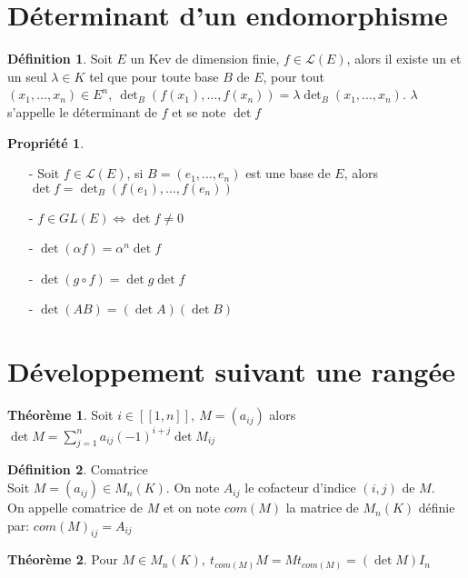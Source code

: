 \documentclass[fleqn]{article}
\theoremstyle{definition} \newtheorem*{defi}{D\'efinition}
\theoremstyle{definition} \newtheorem*{theo}{Th\'eor\`eme}
\theoremstyle{definition} \newtheorem*{coro}{Corollaire}
\theoremstyle{definition} \newtheorem*{nota}{Notation}
\theoremstyle{definition} \newtheorem*{vocab}{Vocabulaire}
\theoremstyle{remark} \newtheorem*{rqs}{Remarques}
\theoremstyle{definition} \newtheorem*{prop}{Propri\'et\'e}
\begin{document}
\section{D\'eterminant d'un endomorphisme}
\begin{defi}
	Soit $E$ un Kev de dimension finie, $f \in \mathscr{L}(E)$, alors il existe un et un seul $\lambda \in K$ tel que pour toute base $B$ de $E$,
	pour tout $(x_1, \hdots, x_n) \in E^n,\ \det_B(f(x_1), \hdots, f(x_n)) = \lambda \det_B(x_1, \hdots, x_n)$. $\lambda$ s'appelle le
	d\'eterminant de $f$ et se note $\det f$
\end{defi}

\begin{prop} $ $
	\begin{enumerate}
		\item [-] Soit $f \in \mathscr{L}(E)$, si $B = (e_1, \hdots, e_n)$ est une base de $E$, alors $\det f = \det_B (f(e_1), \hdots, f(e_n))$
		\item [-] $f \in GL(E) \Leftrightarrow \det f \neq 0$
		\item [-] $\det (\alpha f) = \alpha^n \det f$
		\item [-] $\det (g \circ f) = \det g \det f$
		\item [-] $\det (AB) = (\det A) (\det B)$
	\end{enumerate}
\end{prop}

\section{D\'eveloppement suivant une rang\'ee}
\begin{theo}
	Soit $i \in [\![1,n]\!],\ M = (a_{ij})$ alors $\det M = \sum_{j=1}^n a_{ij}(-1)^{i+j} \det M_{ij}$
\end{theo}

\begin{defi} Comatrice \\
	Soit $M = (a_{ij}) \in M_n(K)$. On note $A_{ij}$ le cofacteur d'indice $(i,j)$ de $M$. \\
	On appelle comatrice de $M$ et on note $com(M)$ la matrice de $M_n(K)$ d\'efinie par: $com(M)_{ij} = A_{ij}$
\end{defi}

\begin{theo} Pour $M \in M_n(K),\ t_{com(M)} M = M t_{com(M)} = (\det M) I_n$

\end{theo}
\end{document}

